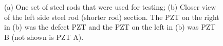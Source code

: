 \begin{figure}
\begin{subfigmatrix}{2}
\end{subfigmatrix}

   \caption[all]
   { \label{fig:steelTR}
(a) One set of steel rods that were used for testing;
(b) Closer view of the left side steel rod (shorter rod) section. The PZT on the right in (b) was the defect PZT and the PZT on the left in (b) was PZT B (not shown is PZT A).
 }
   \end{figure}
   
